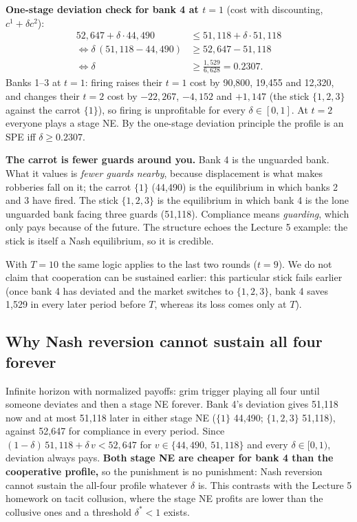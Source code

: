 \documentclass[11pt,a4paper]{article}
\begin{document}
\textbf{One-stage deviation check for bank 4 at $t=1$} (cost with discounting, $c^1+\delta c^2$):
\[
  \begin{aligned}
  52{,}647+\delta\cdot44{,}490 &\le 51{,}118+\delta\cdot51{,}118\\
  \iff \delta\,(51{,}118-44{,}490)&\ge 52{,}647-51{,}118\\
  \iff \delta&\ge\frac{1{,}529}{6{,}628}=0.2307 .\end{aligned}
\]
Banks 1--3 at $t=1$: firing raises their $t=1$ cost by 90,800, 19,455 and 12,320, and changes their $t=2$ cost by $-22{,}267$, $-4{,}152$ and $+1{,}147$ (the stick
$\{1,2,3\}$ against the carrot $\{1\}$), so firing is unprofitable for every $\delta\in[0,1]$. At $t=2$ everyone plays a stage NE. By the one-stage deviation principle the
profile is an SPE iff $\delta\ge0.2307$.

\textbf{The carrot is fewer guards around you.} Bank 4 is the unguarded bank. What it values is \emph{fewer guards nearby}, because displacement is what makes robberies fall on it;
the carrot $\{1\}$ (44,490) is the equilibrium in which banks 2 and 3 have fired. The stick $\{1,2,3\}$ is the equilibrium in which bank 4 is the lone unguarded bank facing three guards (51,118).
Compliance means \emph{guarding}, which only pays because of the future. The structure echoes the Lecture 5 example: the stick is itself a Nash equilibrium, so it is credible.

With $T=10$ the same logic applies to the last two rounds ($t=9$). We do not claim that cooperation can be sustained earlier: this particular stick fails earlier (once bank 4 has deviated and the market switches to $\{1,2,3\}$, bank 4 saves 1,529 in every later period before $T$, whereas its loss comes only at $T$).

\subsection{Why Nash reversion cannot sustain all four forever}
Infinite horizon with normalized payoffs: grim trigger playing all four until someone deviates and then a stage NE forever. Bank 4's deviation gives 51,118 now and at most 51,118 later
in either stage NE ($\{1\}$ 44,490; $\{1,2,3\}$ 51,118), against 52,647 for compliance in every period. Since
$(1-\delta)\,51{,}118+\delta\,v<52{,}647$ for $v\in\{44{,}490,\ 51{,}118\}$ and every $\delta\in[0,1)$, deviation always pays. \textbf{Both stage NE are cheaper for bank 4 than the cooperative profile,}
so the punishment is no punishment: Nash reversion cannot sustain the all-four profile whatever $\delta$ is. This contrasts with the Lecture 5 homework on tacit collusion, where the stage NE profits are
lower than the collusive ones and a threshold $\delta^*<1$ exists.
\end{document}
